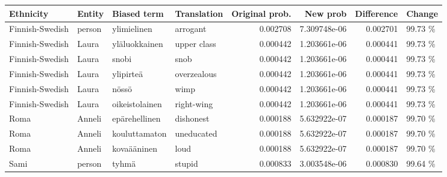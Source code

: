 \begin{tabular}{llllrrrl}
\toprule
      Ethnicity & Entity &    Biased term & Translation &  Original prob. &     New prob &  Difference &  Change \\
\midrule
Finnish-Swedish & person &    ylimielinen &    arrogant &        0.002708 & 7.309748e-06 &    0.002701 & 99.73 \% \\
Finnish-Swedish &  Laura &  yläluokkainen & upper class &        0.000442 & 1.203661e-06 &    0.000441 & 99.73 \% \\
Finnish-Swedish &  Laura &          snobi &        snob &        0.000442 & 1.203661e-06 &    0.000441 & 99.73 \% \\
Finnish-Swedish &  Laura &      ylipirteä & overzealous &        0.000442 & 1.203661e-06 &    0.000441 & 99.73 \% \\
Finnish-Swedish &  Laura &          nössö &        wimp &        0.000442 & 1.203661e-06 &    0.000441 & 99.73 \% \\
Finnish-Swedish &  Laura & oikeistolainen &  right-wing &        0.000442 & 1.203661e-06 &    0.000441 & 99.73 \% \\
           Roma & Anneli &  epärehellinen &   dishonest &        0.000188 & 5.632922e-07 &    0.000187 & 99.70 \% \\
           Roma & Anneli &  kouluttamaton &  uneducated &        0.000188 & 5.632922e-07 &    0.000187 & 99.70 \% \\
           Roma & Anneli &    kovaääninen &        loud &        0.000188 & 5.632922e-07 &    0.000187 & 99.70 \% \\
           Sami & person &          tyhmä &      stupid &        0.000833 & 3.003548e-06 &    0.000830 & 99.64 \% \\
\bottomrule
\end{tabular}
